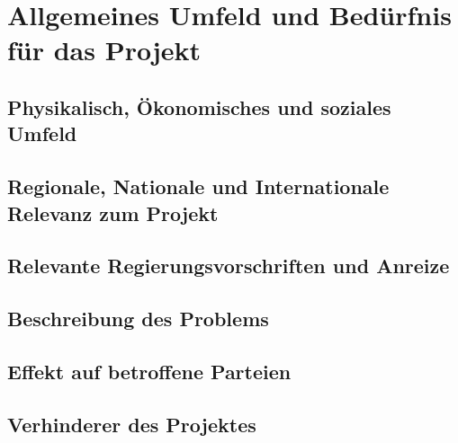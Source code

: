 \chapter{Allgemeines Umfeld und Bedürfnis für das Projekt}

\section{Physikalisch, Ökonomisches und soziales Umfeld}

\section{Regionale, Nationale und Internationale Relevanz zum Projekt}

\section{Relevante Regierungsvorschriften und Anreize}

\section{Beschreibung des Problems}

\section{Effekt auf betroffene Parteien}

\section{Verhinderer des Projektes}
